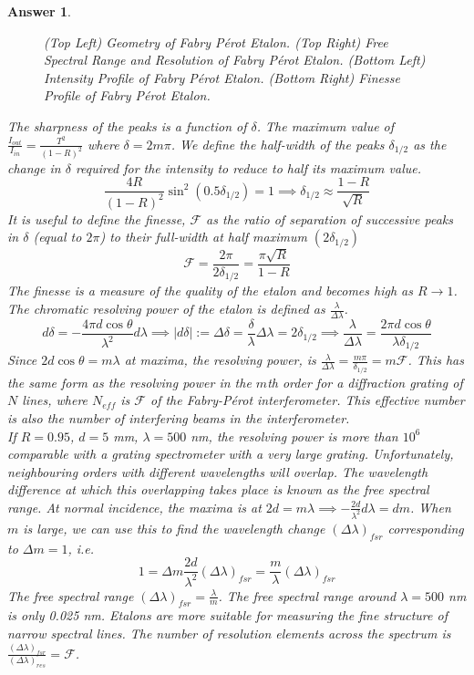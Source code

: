\documentclass[a4paper]{article}
\newtheorem{ans}{Answer}[subsection]
\theoremstyle{new}
\begin{document}
\begin{ans}
\begin{figure}[H]
    \caption{(Top Left) Geometry of Fabry Pérot Etalon. (Top Right) Free Spectral Range and Resolution of Fabry Pérot Etalon. (Bottom Left) Intensity Profile of Fabry Pérot Etalon. (Bottom Right) Finesse Profile of Fabry Pérot Etalon.}
\end{figure}
The sharpness of the peaks is a function of $\delta$. The maximum value of $\frac{I_{out}}{I_{in}}=\frac{T^2}{(1-R)^2}$ where $\delta=2m\pi$. We define the half-width of the peaks $\delta_{1/2}$ as the change in $\delta$ required for the intensity to reduce to half its maximum value.
$$\frac{4R}{(1-R)^2}\sin^2(0.5\delta_{1/2})=1\implies\delta_{1/2}\approx\frac{1-R}{\sqrt{R}}$$
It is useful to define the finesse, $\mathcal{F}$ as the ratio of separation of successive peaks in $\delta$ (equal to $2\pi$) to their full-width at half maximum $(2\delta_{1/2})$
$$\mathcal{F}=\frac{2\pi}{2\delta_{1/2}}=\frac{\pi\sqrt{R}}{1-R}$$
The finesse is a measure of the quality of the etalon and becomes high as $R\rightarrow 1$. The chromatic resolving power of the etalon is defined as $\frac{\lambda}{\Delta\lambda}$.
$$d\delta=-\frac{4\pi d\cos\theta}{\lambda^2}d\lambda\implies|d\delta|:=\Delta\delta=\frac{\delta}{\lambda}\Delta\lambda=2\delta_{1/2}\implies\frac{\lambda}{\Delta\lambda}=\frac{2\pi d\cos\theta}{\lambda\delta_{1/2}}$$
Since $2d\cos\theta=m\lambda$ at maxima, the resolving power, is $\frac{\lambda}{\Delta\lambda}=\frac{m\pi}{\delta_{1/2}}=m\mathcal{F}$. This has the same form as the resolving power in the $m$th order for a diffraction grating of $N$ lines, where $N_{eff}$ is $\mathcal{F}$ of the Fabry-Pérot interferometer. This effective number is also the number of interfering beams in the interferometer.\\[5pt]
If $R=0.95$, $d=5$ mm, $\lambda=500$ nm, the resolving power is more than $10^6$ comparable with a grating spectrometer with a very large grating. Unfortunately, neighbouring orders with different wavelengths will overlap. The wavelength difference at which this  overlapping takes place is known as the free spectral range. At normal incidence, the maxima is at $2d=m\lambda\implies-\frac{2d}{\lambda^2}d\lambda=dm$. When $m$ is large, we can use this to find the wavelength change $(\Delta\lambda)_{fsr}$ corresponding to $\Delta m=1$, i.e.
$$1=\Delta m\frac{2d}{\lambda^2}(\Delta\lambda)_{fsr}=\frac{m}{\lambda}(\Delta\lambda)_{fsr}$$
The free spectral range $(\Delta\lambda)_{fsr}=\frac{\lambda}{m}$. The free spectral range around $\lambda=500$ nm is only 0.025 nm. Etalons are more suitable for measuring the fine structure of narrow spectral lines. The number of resolution elements across the spectrum is $\frac{(\Delta\lambda)_{fsr}}{(\Delta\lambda)_{res}}=\mathcal{F}$.

\end{ans}
\end{document}
